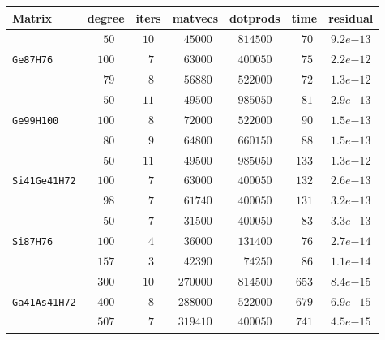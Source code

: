 \begin{tabular}{l|c|c|c|c|c|c}
Matrix & degree & iters & matvecs & dotprods & time & residual \\\hline
 & $\phantom{0}50$ & $10$ & $\phantom{0}45000$ & $814500$ & $\phantom{0}70$ & $9.2e{-13}$ \\
\verb|Ge87H76| & $100$ & $\phantom{0}7$ & $\phantom{0}63000$ & $400050$ & $\phantom{0}75$ & $2.2e{-12}$ \\
 & $\phantom{0}79$ & $\phantom{0}8$ & $\phantom{0}56880$ & $522000$ & $\phantom{0}72$ & $1.3e{-12}$ \\\hline
 & $\phantom{0}50$ & $11$ & $\phantom{0}49500$ & $985050$ & $\phantom{0}81$ & $2.9e{-13}$ \\
\verb|Ge99H100| & $100$ & $\phantom{0}8$ & $\phantom{0}72000$ & $522000$ & $\phantom{0}90$ & $1.5e{-13}$ \\
 & $\phantom{0}80$ & $\phantom{0}9$ & $\phantom{0}64800$ & $660150$ & $\phantom{0}88$ & $1.5e{-13}$ \\\hline
 & $\phantom{0}50$ & $11$ & $\phantom{0}49500$ & $985050$ & $133$ & $1.3e{-12}$ \\
\verb|Si41Ge41H72| & $100$ & $\phantom{0}7$ & $\phantom{0}63000$ & $400050$ & $132$ & $2.6e{-13}$ \\
 & $\phantom{0}98$ & $\phantom{0}7$ & $\phantom{0}61740$ & $400050$ & $131$ & $3.2e{-13}$ \\\hline
 & $\phantom{0}50$ & $\phantom{0}7$ & $\phantom{0}31500$ & $400050$ & $\phantom{0}83$ & $3.3e{-13}$ \\
\verb|Si87H76| & $100$ & $\phantom{0}4$ & $\phantom{0}36000$ & $131400$ & $\phantom{0}76$ & $2.7e{-14}$ \\
 & $157$ & $\phantom{0}3$ & $\phantom{0}42390$ & $\phantom{0}74250$ & $\phantom{0}86$ & $1.1e{-14}$ \\\hline
 & $300$ & $10$ & $270000$ & $814500$ & $653$ & $8.4e{-15}$ \\
\verb|Ga41As41H72| & $400$ & $\phantom{0}8$ & $288000$ & $522000$ & $679$ & $6.9e{-15}$ \\
 & $507$ & $\phantom{0}7$ & $319410$ & $400050$ & $741$ & $4.5e{-15}$  \\
\end{tabular}